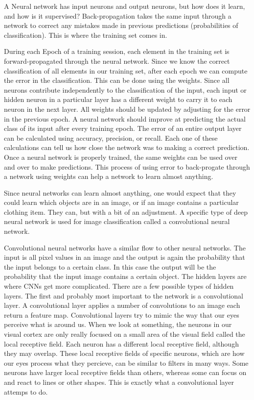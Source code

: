 \documentclass[12pt]{report} %
\begin{document}
 	A Neural network has input neurons and output neurons, but how does it learn, and how is it supervised? Back-propagation takes the same input through a network to correct any mistakes made in previous predictions (probabilities of classification). This is where the training set comes in. 

	During each Epoch of a training session, each element in the training set is forward-propagated through the neural network. Since we know the correct classification of all elements in our training set, after each epoch we can compute the error in the classification. This can be done using the weights. Since all neurons contribute independently to the classification of the input, each input or hidden neuron in a particular layer has a different weight to carry it to each neuron in the next layer. All weights should be updated by adjusting for the error in the previous epoch. A neural network should improve at predicting the actual class of its input after every training epoch. The error of an entire output layer can be calculated using accuracy, precision, or recall. Each one of these calculations can tell us how close the network was to making a correct prediction. Once a neural network is properly trained, the same weights can be used over and over to make predictions. This process of using error to back-progate through a network using weights can help a network to learn almost anything.\cite{KubatMachineLearn} 
	
	Since neural networks can learn almost anything, one would expect that they could learn which objects are in an image, or if an image contains a particular clothing item. They can, but with a bit of an adjustment. A specific type of deep neural network is used for image classification called a convolutional neural network. 

	Convolutional neural networks have a similar flow to other neural networks. The input is all pixel values in an image and the output is again the probability that the input belongs to a certain class. In this case the output will be the probability that the input image contains a certain object. The hidden layers are where CNNs get more complicated. There are a few possible types of hidden layers. The first and probably most important to the network is a convolutional layer. A convolutional layer applies a number of convolutions to an image each return a feature map\cite{aurelienMachineLearning}. 
	Convolutional layers try to mimic the way that our eyes perceive what is around us. When we look at something, the neurons in our visual cortex are only really focused on a small area of the visual field called the local receptive field. Each neuron has a different local receptive field, although they may overlap. These local receptive fields of specific neurons, which are how our eyes process what they percieve, can be similar to filters in many ways. Some neurons have larger local receptive fields than others, whereas some can focus on and react to lines or other shapes. This is exactly what a convolutional layer attemps to do.\cite{aurelienMachineLearning} 
	
\end{document}
